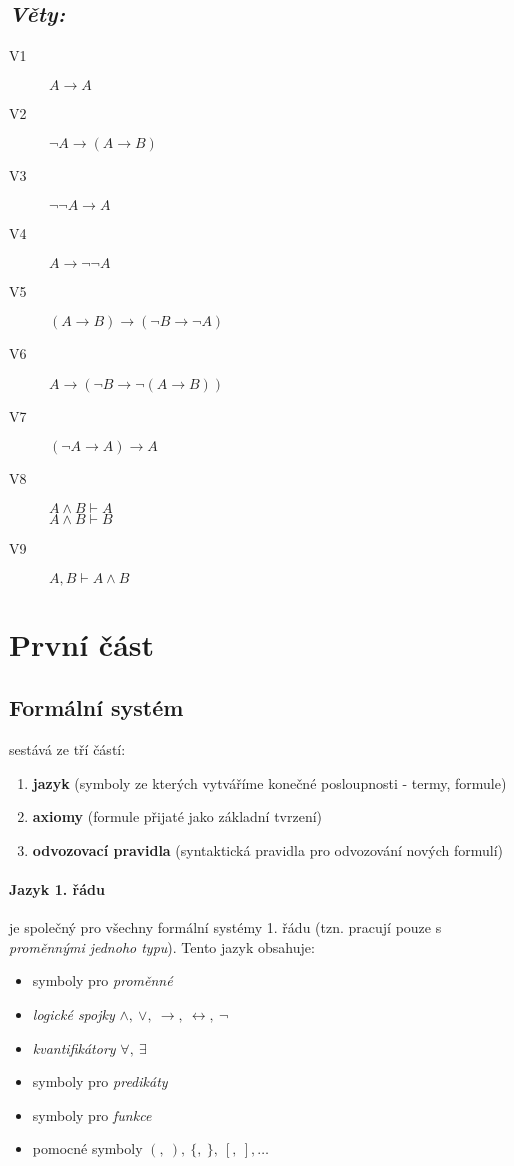 \documentclass[a4paper]{article}      %
\begin{document}
\subsection*{\textsl{Věty:}}
\begin{description}
	\item[V1]	$A\rightarrow A$
	\item[V2]	$\neg A \rightarrow (A \rightarrow B)$
	\item[V3]	$\neg \neg A \rightarrow A$
	\item[V4]	$A\rightarrow \neg \neg A$
	\item[V5]	$(A \rightarrow B) \rightarrow (\neg B \rightarrow \neg A)$
	\item[V6]	$A \rightarrow (\neg B \rightarrow \neg (A \rightarrow B))$
	\item[V7]	$(\neg A \rightarrow A) \rightarrow A$
	\item[V8]	$A \wedge B \vdash A$\\
						$A \wedge B \vdash B$
	\item[V9]	$A,B \vdash A \wedge B$ 
\end{description}

\section{První část}

\subsection{Formální systém} sestává ze tří částí:
\begin{enumerate}
\item \textbf{jazyk} (symboly ze kterých vytváříme konečné posloupnosti - termy, formule)
\item \textbf{axiomy} (formule přijaté jako základní tvrzení)
\item \textbf{odvozovací pravidla} (syntaktická pravidla pro odvozování nových formulí)
\end{enumerate}

\paragraph{Jazyk 1. řádu} je společný pro všechny formální systémy 1. řádu (tzn. pracují pouze s \emph{proměnnými jednoho typu}).
Tento jazyk obsahuje:
\begin{itemize}
	\item symboly pro \emph{proměnné}
	\item \emph{logické spojky} $\wedge,\ \vee,\ \rightarrow,\ \leftrightarrow,\ \neg$
	\item \emph{kvantifikátory} $\forall,\ \exists$
	\item symboly pro \emph{predikáty}
	\item symboly pro \emph{funkce}
	\item pomocné symboly $(,\ ),\ \lbrace,\ \rbrace,\ [,\ ],\ldots$
\end{itemize}
\end{document}
